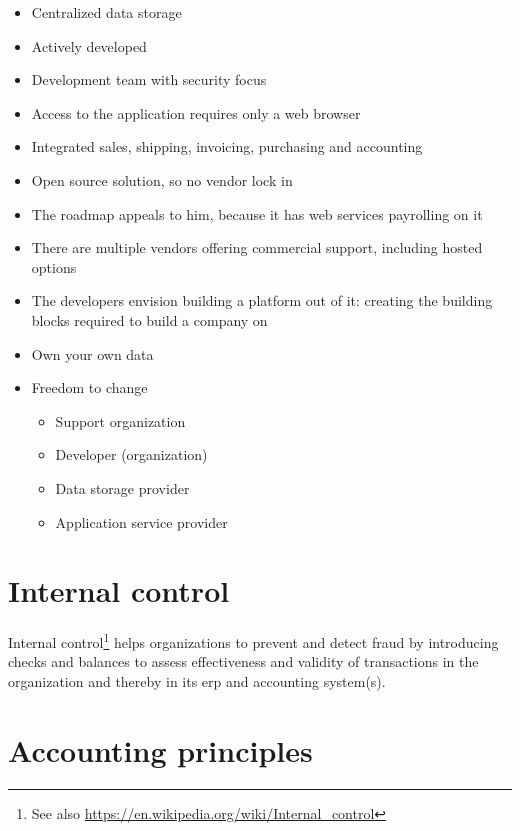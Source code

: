 \begin{itemize}
\item Centralized data storage
\item Actively developed
\item Development team with security focus
\item Access to the application requires only a web browser
\item Integrated sales, shipping, invoicing, purchasing and accounting
\item Open source solution, so no vendor lock in
\item The roadmap appeals to him, because it has web services payrolling on it
\item There are multiple vendors offering commercial support, including hosted options
\item The developers envision building a platform out of it: creating the building blocks
required to build a company on
\end{itemize}


\begin{itemize}
\item Own your own data
\item Freedom to change
        \begin{itemize}
        \item Support organization
        \item Developer (organization)
        \item Data storage provider
        \item Application service provider
        \end{itemize}
\end{itemize}

\section{Internal control}
\label{sec-advocacy-internal-control}

Internal control\footnote{See also \url{https://en.wikipedia.org/wiki/Internal_control}}
helps organizations to prevent and detect fraud by introducing checks and balances
to assess effectiveness and validity of transactions in the organization and thereby
in its \gls{erp} and accounting system(s).

\section{Accounting principles}
\label{sec-system-accounting-principles}

